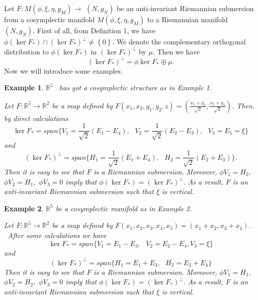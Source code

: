 \documentclass{amsart}
\theoremstyle{plain}
\newtheorem{example}{Example}
\numberwithin{equation}{section}
\begin{document}
Let $F:M(\phi ,\xi ,\eta ,g_{M})\rightarrow $ $(N,g_{N})$ be an
anti-invariant Riemannian submersion from a cosymplectic manifold $M(\phi
,\xi ,\eta ,g_{M})$ to a Riemannian manifold $(N,g_{N}).$ First of all, from
Definition 1, we have $\phi (\ker F_{\ast })\cap (\ker F_{\ast })^{\bot
}\neq \left\{ 0\right\} .$ We denote the complementary orthogonal
distribution to $\phi (\ker F_{\ast })$ in $(\ker F_{\ast })^{\bot }$ by $\mu .$ Then we have\begin{equation}
(\ker F_{\ast })^{\bot }=\phi \ker F_{\ast }\oplus \mu .  \label{A1}
\end{equation}Now we will introduce some examples.\ \ \ \ \ \ \ \ 

\begin{example}
$\mathbb{R}
^{5}$ \ has got a cosymplectic structure as in Example 1.

Let $F:\mathbb{R}
^{5}\rightarrow 
\mathbb{R}
^{2}$ be a map defined by $F(x_{1},x_{2},y_{1},y_{2},z)=(\frac{x_{1}+y_{2}}{\sqrt{2}},\frac{x_{2}+y_{1}}{\sqrt{2}})$. Then, by direct calculations 
\begin{equation*}
\ker F_{\ast }=span\{V_{1}=\frac{1}{\sqrt{2}}(E_{1}-E_{4}),\text{ }V_{2}=\frac{1}{\sqrt{2}}(E_{2}-E_{3}),\text{ }V_{3}=E_{5}=\xi \}
\end{equation*}and 
\begin{equation*}
(\ker F_{\ast })^{\bot }=span\{H_{1}=\frac{1}{\sqrt{2}}(E_{1}+E_{4}),\text{ }H_{2}=\frac{1}{\sqrt{2}}(E_{2}+E_{3})\}.
\end{equation*}Then it is easy to see that $F$ is a Riemannian submersion. Moreover, $\phi
V_{1}=H_{2},$ $\phi V_{2}=H_{1},$ $\phi V_{3}=0$ imply that $\phi (\ker
F_{\ast })=(\ker F_{\ast })^{\bot }.$ As a result, $F$ is an anti-invariant
Riemannian submersion such that $\xi $ is vertical.
\end{example}

\begin{example}
$\mathbb{R}
^{5}$ be a cosymplectic manifold as in Example 2.

Let $F:\mathbb{R}
^{5}\rightarrow 
\mathbb{R}
^{2}$ be a map defined by $F(x_{1},x_{2},x_{3},x_{4},x_{5})=(x_{1}+x_{2},x_{3}+x_{4})$. \ After some
calculations we have\begin{equation*}
\ker F_{\ast }=span\{V_{1}=E_{1}-E_{3},\text{ }V_{2}=E_{2}-E_{4},V_{3}=\xi \}
\end{equation*}and\begin{equation*}
(\ker F_{\ast })^{\bot }=span\{H_{1}=E_{1}+E_{3},\text{ }H_{2}=E_{2}+E_{4}\}
\end{equation*}Then it is easy to see that $F$ is a Riemannian submersion. Moreover, $\phi
V_{1}=H_{1},$ $\phi V_{2}=H_{2},$ $\phi V_{3}=0$ imply that $\phi (\ker
F_{\ast })=(\ker F_{\ast })^{\bot }.$ As a result, $F$ is an anti-invariant
Riemannian submersion such that $\xi $ is vertical.
\end{example}
\end{document}
